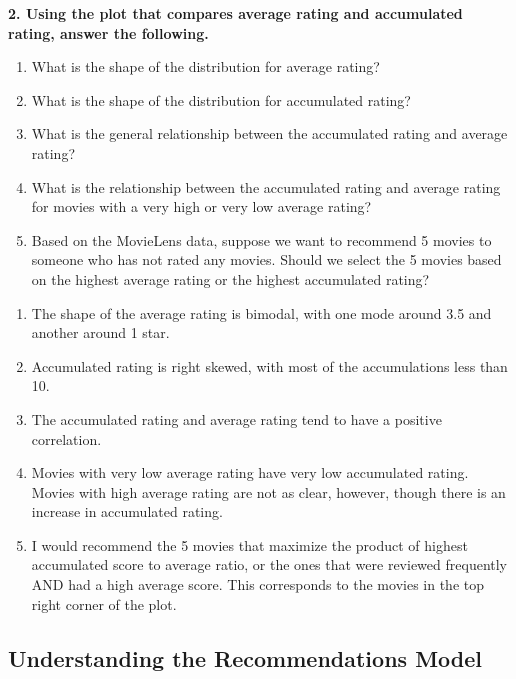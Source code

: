 \documentclass{article}
\begin{document}
\bigskip


\textbf{2. Using the plot that compares average rating and accumulated rating, answer the following.}
\begin{enumerate}[label=\Alph*.]
\item What is the shape of the distribution for average rating?
\item What is the shape of the distribution for accumulated rating?
\item What is the general relationship between the accumulated rating and average rating?
\item What is the relationship between the accumulated rating and average rating for movies with a very high or very low average rating? 
\item Based on the MovieLens data, suppose we want to recommend 5 movies to someone who has not rated any movies. Should we select the 5 movies based on the highest average rating or the highest accumulated rating?
\end{enumerate}


\bigskip

\begin{mdframed}
\begin{enumerate}[label=\Alph*.]
\item The shape of the average rating is bimodal, with one mode around 3.5 and another around 1 star.
\item Accumulated rating is right skewed, with most of the accumulations less than 10.
\item The accumulated rating and average rating tend to have a positive correlation. 
\item Movies with very low average rating have very low accumulated rating. Movies with high average rating are not as clear, however, though there is an increase in accumulated rating.
\item I would recommend the 5 movies that maximize the product of highest accumulated score to average ratio, or the ones that were reviewed frequently AND had a high average score. This corresponds to the movies in the top right corner of the plot.
\end{enumerate}
\end{mdframed}

\bigskip

\subsection*{Understanding the Recommendations Model}
\end{document}
